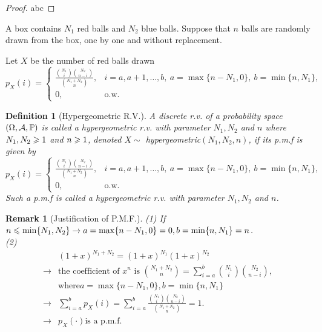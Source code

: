 \documentclass[openany,12pt]{book}
\newtheorem{remark}{Remark}[chapter]
\newtheorem{definition}{Definition}[chapter]
\begin{document}
\begin{proof}
  abc
\end{proof}

A box contains $N_1$ red balls and $N_2$ blue balls. Suppose that $n$ balls are randomly drawn from the box, one by one and without replacement.

Let $X$ be the number of red balls drawn
\begin{equation}
  p_X(i)=
  \begin{cases}
    \frac{\binom {N_1} i \binom {N_2} {n-i}}{\binom {N_1+N_2} n}, &i=a,a+1,\dots,b,~a=\max\{n-N_1,0\},~b=\min\{n,N_1\}, \\
    0, &\text{o.w.}
  \end{cases}
\end{equation}

\begin{definition}[Hypergeometric R.V.]
  A discrete r.v. of a probability space $(\Omega,\mathcal{A},\mathbb{P})$ is called a hypergeometric r.v. with parameter $N_1, N_2$ and $n$ where $N_1,N_2\geqslant1$ and $n\geqslant1$, denoted $X\sim$ hypergeometric$(N_1,N_2,n)$, if its p.m.f is given by
  $$
    p_X(i)=
    \begin{cases}
      \frac{\binom {N_1} i \binom {N_2} {n-i}}{\binom {N_1+N_2} n}, &i=a,a+1,\dots,b,~a=\max\{n-N_1,0\},~b=\min\{n,N_1\}, \\
      0, &\text{o.w.}
    \end{cases}
  $$
  Such a p.m.f is called a hypergeometric r.v. with parameter $N_1, N_2$ and $n$.
\end{definition}

\begin{remark}[Justification of P.M.F.]
  (1) If $n\leqslant\min\{N_1,N_2\}\to a=\max\{n-N_1,0\}=0,b=\min\{n,N_1\}=n$.\\
  (2)
  $$
    \begin{aligned}
          & (1+x)^{N_1+N_2}=(1+x)^{N_1}(1+x)^{N_2}                                                            \\
      \to & \text{the coefficient of } x^n \text{ is }
      \binom{N_1+N_2}{n}=\sum_{i=a}^{b}\binom{N_1}{i}\binom{N_2}{n-i},                                        \\
          & \text{where}  a=\max\{n-N_1,0\},b=\min\{n,N_1\}                                                   \\
      \to & \sum_{i=a}^{b}{p_X(i)}=\sum_{i=a}^{b}\frac{\binom{N_1}{i}\binom{N_2}{n-i}}{\binom{N_1+N_2}{n}}=1. \\
      \to & p_X\left(\cdot\right) \text{is a p.m.f.}
    \end{aligned}
  $$
\end{remark}
\end{document}
